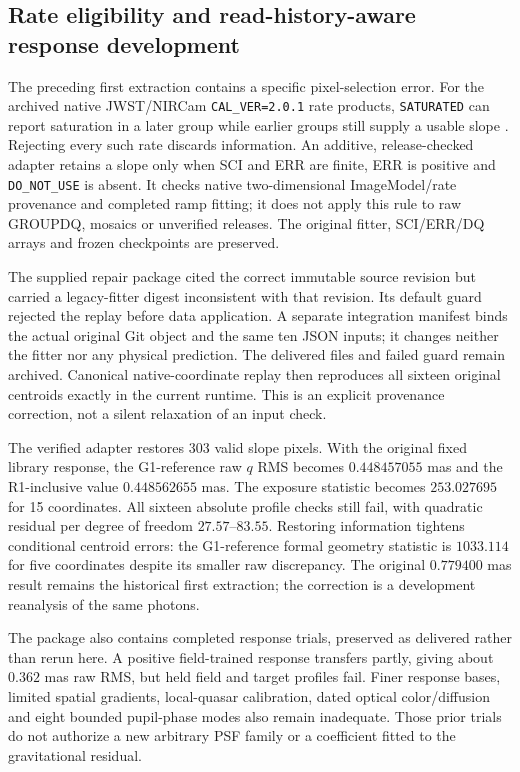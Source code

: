 \subsection{Rate eligibility and read-history-aware response development}
\label{sec:he0435-response-repair}

The preceding first extraction contains a specific pixel-selection error.
For the archived native JWST/NIRCam \texttt{CAL\_VER=2.0.1} rate products,
\texttt{SATURATED} can report saturation in a later group while earlier
groups still supply a usable slope \citep{STCalChanges}.
Rejecting every such rate discards
information. An additive, release-checked adapter retains a slope only
when SCI and ERR are finite, ERR is positive and \texttt{DO\_NOT\_USE}
is absent. It checks native two-dimensional ImageModel/rate provenance
and completed ramp fitting; it does not apply this rule to raw GROUPDQ,
mosaics or unverified releases. The original fitter, SCI/ERR/DQ arrays
and frozen checkpoints are preserved.

The supplied repair package cited the correct immutable source revision
but carried a legacy-fitter digest inconsistent with that revision.
Its default guard rejected the replay before data application. A
separate integration manifest binds the actual original Git object and
the same ten JSON inputs; it changes neither the fitter nor any physical
prediction. The delivered files and failed guard remain archived.
Canonical native-coordinate replay then reproduces all sixteen original
centroids exactly in the current runtime. This is an explicit provenance
correction, not a silent relaxation of an input check.

The verified adapter restores 303 valid slope pixels. With the original
fixed library response, the G1-reference raw $q$ RMS becomes
$0.448457055$ mas and the R1-inclusive value $0.448562655$ mas.
The exposure statistic becomes $253.027695$ for 15 coordinates.
All sixteen absolute profile checks still fail, with quadratic residual
per degree of freedom $27.57$--$83.55$. Restoring information tightens
conditional centroid errors: the G1-reference formal geometry statistic
is $1033.114$ for five coordinates despite its smaller raw discrepancy.
The original $0.779400$ mas result remains the historical first extraction;
the correction is a development reanalysis of the same photons.

The package also contains completed response trials, preserved as delivered
rather than rerun here. A positive field-trained response transfers partly,
giving about $0.362$ mas raw RMS, but held field and target profiles fail.
Finer response bases, limited spatial gradients, local-quasar calibration,
dated optical color/diffusion and eight bounded pupil-phase modes also
remain inadequate. Those prior trials do not authorize a new arbitrary
PSF family or a coefficient fitted to the gravitational residual.

